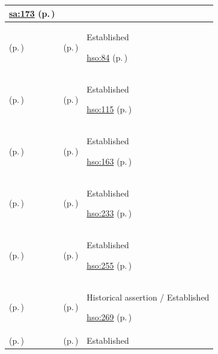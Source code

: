 \begin{longtable}{|>{\raggedright\arraybackslash}p{0.27\TableWidth}|>{\raggedright\arraybackslash}p{0.27\TableWidth}|>{\raggedright\arraybackslash}p{0.46\TableWidth}|}
 \hyperref[rad:sa:163]{sa:173} (p.\,\pageref{rad:sa:163})\\\hline
\nameref{function:manage-clinic-queue-progression} (p.\,\pageref{function:manage-clinic-queue-progression}) & \nameref{process:clinic-operational-queue-progression-process} (p.\,\pageref{process:clinic-operational-queue-progression-process}) & Established

 \hyperref[rad:hso:72]{hso:84} (p.\,\pageref{rad:hso:72})\\\hline
\nameref{function:manage-theatre-case-progression} (p.\,\pageref{function:manage-theatre-case-progression}) & \nameref{process:theatre-case-progression-process} (p.\,\pageref{process:theatre-case-progression-process}) & Established

 \hyperref[rad:hso:106]{hso:115} (p.\,\pageref{rad:hso:106})\\\hline
\nameref{function:manage-bed-turnover-progression} (p.\,\pageref{function:manage-bed-turnover-progression}) & \nameref{process:bed-turnover-process} (p.\,\pageref{process:bed-turnover-process}) & Established

 \hyperref[rad:hso:151]{hso:163} (p.\,\pageref{rad:hso:151})\\\hline
\nameref{function:manage-operational-work-progression} (p.\,\pageref{function:manage-operational-work-progression}) & \nameref{process:operational-work-progression-process} (p.\,\pageref{process:operational-work-progression-process}) & Established

 \hyperref[rad:hso:221]{hso:233} (p.\,\pageref{rad:hso:221})\\\hline
\nameref{function:manage-patient-transport-progression} (p.\,\pageref{function:manage-patient-transport-progression}) & \nameref{process:patient-transport-process} (p.\,\pageref{process:patient-transport-process}) & Established

 \hyperref[rad:hso:250]{hso:255} (p.\,\pageref{rad:hso:250})\\\hline
\nameref{function:manage-specimen-transport-progression} (p.\,\pageref{function:manage-specimen-transport-progression}) & \nameref{process:specimen-transport-process} (p.\,\pageref{process:specimen-transport-process}) & Historical assertion / Established

 \hyperref[rad:hso:264]{hso:269} (p.\,\pageref{rad:hso:264})\\\hline
\nameref{function:manage-discharge-coordination-progression} (p.\,\pageref{function:manage-discharge-coordination-progression}) & \nameref{process:discharge-progression-process} (p.\,\pageref{process:discharge-progression-process}) & Established


\end{longtable}
